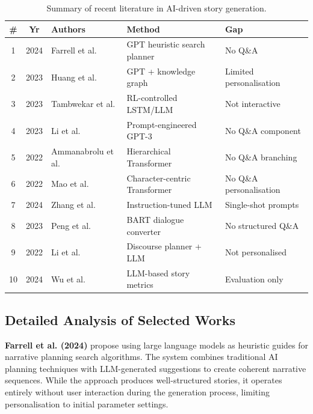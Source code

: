 \begin{table}[!t]
\caption{Summary of recent literature in AI-driven story generation.}
\label{tab:literature}
\centering
\renewcommand{\arraystretch}{1.15}
\small
\begin{tabular}{@{}c c l p{4.8cm} p{2.2cm}@{}}
\toprule
\textbf{\#} & \textbf{Yr} & \textbf{Authors} & \textbf{Method} & \textbf{Gap} \\
\midrule
1 & 2024 & Farrell et al. \cite{farrell2024narrative}      & GPT heuristic search planner & No Q\&A \\
2 & 2023 & Huang et al. \cite{huang2023knowledge}          & GPT + knowledge graph        & Limited personalisation \\
3 & 2023 & Tambwekar et al. \cite{tambwekar2023controllable}& RL-controlled LSTM/LLM       & Not interactive \\
4 & 2023 & Li et al. \cite{li2023plotguided}               & Prompt-engineered GPT-3      & No Q\&A component \\
5 & 2022 & Ammanabrolu et al. \cite{ammanabrolu2022hier}   & Hierarchical Transformer     & No Q\&A branching \\
6 & 2022 & Mao et al. \cite{mao2022character}              & Character-centric Transformer & No Q\&A personalisation \\
7 & 2024 & Zhang et al. \cite{zhang2024prompt}             & Instruction-tuned LLM        & Single-shot prompts \\
8 & 2023 & Peng et al. \cite{peng2023dialogue}             & BART dialogue converter      & No structured Q\&A \\
9 & 2022 & Li et al. \cite{li2022discourse}                & Discourse planner + LLM      & Not personalised \\
10& 2024 & Wu et al. \cite{wu2024evaluation}               & LLM-based story metrics      & Evaluation only \\
\bottomrule
\end{tabular}
\end{table}

\subsection{Detailed Analysis of Selected Works}
\textbf{Farrell et al. (2024)} \cite{farrell2024narrative} propose
using large language models as heuristic guides for narrative
planning search algorithms. The system combines traditional AI
planning techniques with LLM-generated suggestions to create coherent
narrative sequences. While the approach produces well-structured
stories, it operates entirely without user interaction during the
generation process, limiting personalisation to initial parameter
settings.

